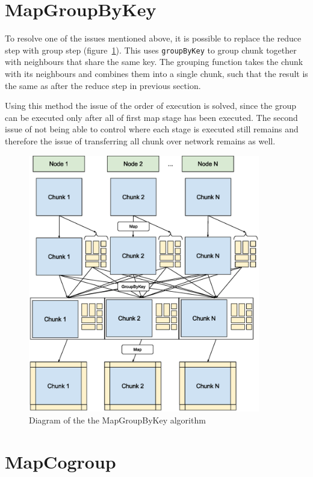\documentclass{l4proj}
\begin{document}
\section{MapGroupByKey}

To resolve one of the issues mentioned above, it is possible to replace the reduce
step with group step (figure~\ref{fig:map_group}). This uses \texttt{groupByKey} to group chunk together with
neighbours that share the same key. The grouping function takes the chunk with
its neighbours and combines them into a single chunk, such that the result is the
same as after the reduce step in previous section.

Using this method the issue of the order of execution is solved, since the group
can be executed only after all of first map stage has been executed. The second issue
of not being able to control where each stage is executed still remains and therefore
the issue of transferring all chunk over network remains as well.

\begin{figure}
\centering
\includegraphics[width=0.9\textwidth]{images/MapGroup.eps}
\caption{Diagram of the the MapGroupByKey algorithm}
\label{fig:map_group}
\end{figure}

\section{MapCogroup}
\end{document}
